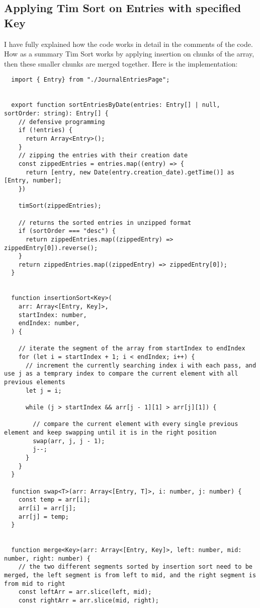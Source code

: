 \subsection{Applying Tim Sort on Entries with specified Key}
I have fully explained how the code works in detail in the comments of the code. How as a summary Tim Sort works by applying insertion on chunks of the array, then these smaller chunks are merged together. Here is the implementation:
\begin{verbatim}
  import { Entry} from "./JournalEntriesPage";


  export function sortEntriesByDate(entries: Entry[] | null, sortOrder: string): Entry[] {
    // defensive programming
    if (!entries) {
      return Array<Entry>();
    }
    // zipping the entries with their creation date
    const zippedEntries = entries.map((entry) => {
      return [entry, new Date(entry.creation_date).getTime()] as [Entry, number];
    })
  
    timSort(zippedEntries);
  
    // returns the sorted entries in unzipped format
    if (sortOrder === "desc") {
      return zippedEntries.map((zippedEntry) => zippedEntry[0]).reverse();
    }
    return zippedEntries.map((zippedEntry) => zippedEntry[0]);
  }
  
  
  function insertionSort<Key>(
    arr: Array<[Entry, Key]>,
    startIndex: number,
    endIndex: number,
  ) {
  
    // iterate the segment of the array from startIndex to endIndex
    for (let i = startIndex + 1; i < endIndex; i++) {
      // increment the currently searching index i with each pass, and use j as a temprary index to compare the current element with all previous elements
      let j = i;
  
      while (j > startIndex && arr[j - 1][1] > arr[j][1]) {
  
        // compare the current element with every single previous element and keep swapping until it is in the right position
        swap(arr, j, j - 1);
        j--;
      }
    }
  }
  
  function swap<T>(arr: Array<[Entry, T]>, i: number, j: number) {
    const temp = arr[i];
    arr[i] = arr[j];
    arr[j] = temp;
  }
  
  
  function merge<Key>(arr: Array<[Entry, Key]>, left: number, mid: number, right: number) {
    // the two different segments sorted by insertion sort need to be merged, the left segment is from left to mid, and the right segment is from mid to right
    const leftArr = arr.slice(left, mid);
    const rightArr = arr.slice(mid, right);
  

\end{verbatim}
